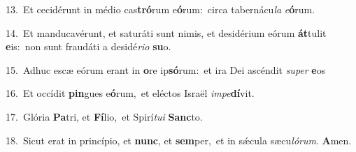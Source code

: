 {\numbfont\textcolor{\numbcolor}{13.}}~Et cecidérunt in médio cas\-\textbf{tró}\-rum e\-\textbf{ó}\-rum:~\star circa tabernácu\textit{la} \textit{e}\-\textbf{ó}rum.\par
{\numbfont\textcolor{\numbcolor}{14.}}~Et manducavérunt, et saturáti sunt nimis, et desidérium eórum \textbf{át}\-tulit \textbf{e}\-is:~\star non sunt fraudáti a desidé\-\textit{ri}\-\textit{o} \textbf{su}\-o.\par
{\numbfont\textcolor{\numbcolor}{15.}}~Adhuc escæ eórum erant in \textbf{o}\-re ip\-\textbf{só}\-rum:~\star et ira Dei ascéndit \textit{su}\-\textit{per} \textbf{e}\-os\par
{\numbfont\textcolor{\numbcolor}{16.}}~Et occídit \textbf{pin}\-gues e\-\textbf{ó}\-rum,~\star et eléctos Israël \textit{im}\-\textit{pe}\textbf{dí}vit.\par
{\numbfont\textcolor{\numbcolor}{17.}}~Glória \textbf{Pa}\-tri, et \textbf{Fí}\-lio,~\star et Spirí\-\textit{tu}\-\textit{i} \textbf{Sanc}\-to.\par
{\numbfont\textcolor{\numbcolor}{18.}}~Sicut erat in princípio, et \textbf{nunc}\-, et \textbf{sem}\-per,~\star et in sǽcula sæcu\-\textit{ló}\-\textit{rum}. \textbf{A}\-men.\par
